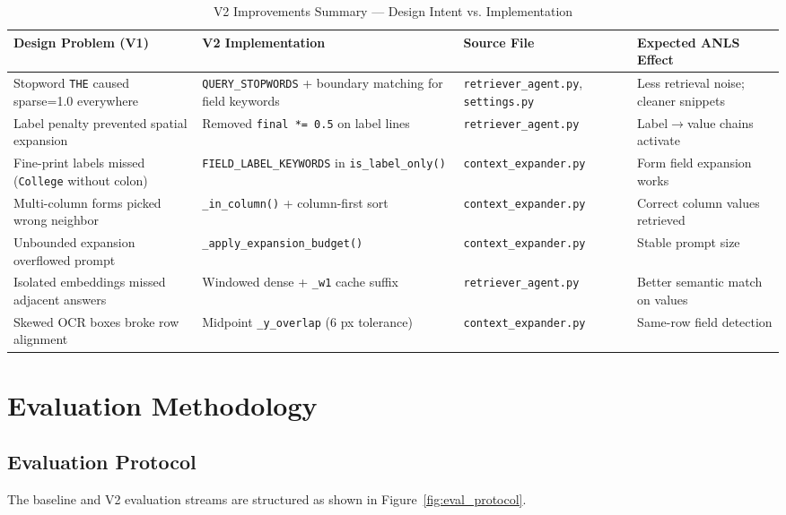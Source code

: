 \documentclass[11pt,a4paper]{article}
\begin{document}
\begin{table}[H]
\centering
\caption{V2 Improvements Summary --- Design Intent vs. Implementation}
\label{tab:v2_improvements}
\begin{small}
\begin{tabular}{|p{4cm}|p{4cm}|p{3.5cm}|p{3.5cm}|}
\hline
\textbf{Design Problem (V1)} & \textbf{V2 Implementation} & \textbf{Source File} & \textbf{Expected ANLS Effect} \\ \hline
Stopword \texttt{THE} caused sparse=1.0 everywhere & \texttt{QUERY\_STOPWORDS} + boundary matching for field keywords & \texttt{retriever\_agent.py}, \texttt{settings.py} & Less retrieval noise; cleaner snippets \\ \hline
Label penalty prevented spatial expansion & Removed \texttt{final *= 0.5} on label lines & \texttt{retriever\_agent.py} & Label$\rightarrow$value chains activate \\ \hline
Fine-print labels missed (\texttt{College} without colon) & \texttt{FIELD\_LABEL\_KEYWORDS} in \texttt{is\_label\_only()} & \texttt{context\_expander.py} & Form field expansion works \\ \hline
Multi-column forms picked wrong neighbor & \texttt{\_in\_column()} + column-first sort & \texttt{context\_expander.py} & Correct column values retrieved \\ \hline
Unbounded expansion overflowed prompt & \texttt{\_apply\_expansion\_budget()} & \texttt{context\_expander.py} & Stable prompt size \\ \hline
Isolated embeddings missed adjacent answers & Windowed dense + \texttt{\_w1} cache suffix & \texttt{retriever\_agent.py} & Better semantic match on values \\ \hline
Skewed OCR boxes broke row alignment & Midpoint \texttt{\_y\_overlap} (6 px tolerance) & \texttt{context\_expander.py} & Same-row field detection \\ \hline
\end{tabular}
\end{small}
\end{table}

\section{Evaluation Methodology}

\subsection{Evaluation Protocol}
The baseline and V2 evaluation streams are structured as shown in Figure~\ref{fig:eval_protocol}.
\end{document}
